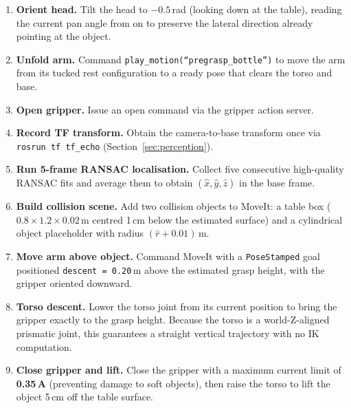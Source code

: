 \begin{enumerate}[noitemsep]
  \item \textbf{Orient head.}
        Tilt the head to $-0.5$\,rad (looking down at the table), reading the
        current pan angle from  on 
        to preserve the lateral direction already pointing at the object.

  \item \textbf{Unfold arm.}
        Command \texttt{play\_motion(``pregrasp\_bottle'')} to move the arm
        from its tucked rest configuration to a ready pose that clears
        the torso and base.

  \item \textbf{Open gripper.}
        Issue an open command via the gripper action server.

  \item \textbf{Record TF transform.}
        Obtain the camera-to-base transform once via \texttt{rosrun tf
        tf\_echo} (Section~\ref{sec:perception}).

  \item \textbf{Run 5-frame RANSAC localisation.}
        Collect five consecutive high-quality RANSAC fits and average them
        to obtain $(\hat{x}, \hat{y}, \hat{z})$ in the base frame.

  \item \textbf{Build collision scene.}
        Add two collision objects to MoveIt: a table box
        ($0.8\times1.2\times0.02$\,m centred 1\,cm below the estimated
        surface) and a cylindrical object placeholder with radius
        $(\hat{r} + 0.01)$\,m.

  \item \textbf{Move arm above object.}
        Command MoveIt with a \texttt{PoseStamped} goal positioned
        \texttt{descent = 0.20}\,m above the estimated grasp height,
        with the gripper oriented downward.

  \item \textbf{Torso descent.}
        Lower the torso joint from its current position to bring the
        gripper exactly to the grasp height.
        Because the torso is a world-Z-aligned prismatic joint, this
        guarantees a straight vertical trajectory with no IK computation.

  \item \textbf{Close gripper and lift.}
        Close the gripper with a maximum current limit of
        \textbf{0.35\,A} (preventing damage to soft objects), then raise
        the torso to lift the object 5\,cm off the table surface.
\end{enumerate}

